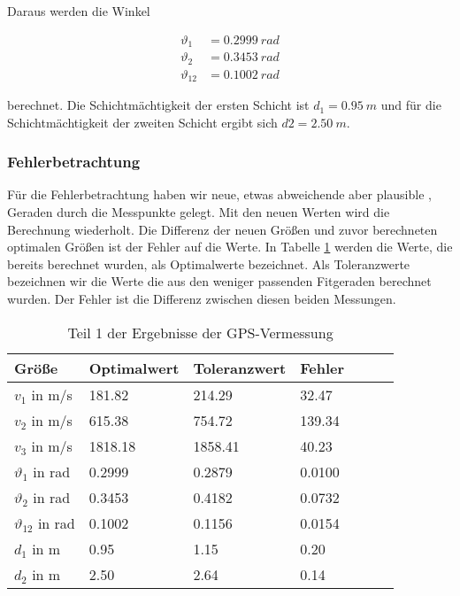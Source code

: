 Daraus werden die Winkel 

\begin{align}
 \vartheta_1 &= \SI{0.2999}{rad} \\
 \vartheta_2 &= \SI{0.3453}{rad} \\
 \vartheta_12 &= \SI{0.1002}{rad}
\end{align}

berechnet.
Die Schichtmächtigkeit der ersten Schicht ist $d_1 =\SI{0.95}{m}$ und für die Schichtmächtigkeit der zweiten Schicht ergibt sich $d2 = \SI{2.50}{m}$.\\

\subsubsection{Fehlerbetrachtung}

Für die Fehlerbetrachtung haben wir neue, etwas abweichende aber plausible , Geraden durch die Messpunkte gelegt. Mit den neuen Werten wird die Berechnung wiederholt. Die Differenz der neuen Größen und zuvor berechneten optimalen Größen ist der Fehler auf die Werte. In Tabelle \ref{tab:S21-S22} werden die Werte, die bereits berechnet wurden, als Optimalwerte bezeichnet. Als Toleranzwerte bezeichnen wir die Werte die aus den weniger passenden Fitgeraden berechnet wurden. Der Fehler ist die Differenz zwischen diesen beiden Messungen.


\begin{table}[!ht]
\centering
\caption{Teil 1 der Ergebnisse der GPS-Vermessung}
\label{tab:S21-S22}
\begin{tabular}{lllllll}
\toprule
Größe   & Optimalwert   & Toleranzwert   & Fehler \\
\midrule
$v_1$ in m/s & 181.82 & 214.29 & 32.47 \\
$v_2$ in m/s & 615.38 & 754.72 & 139.34 \\
$v_3$ in m/s & 1818.18 & 1858.41 & 40.23 \\
$\vartheta_1$ in rad & 0.2999 & 0.2879 & 0.0100 \\
$\vartheta_2$ in rad & 0.3453 & 0.4182 & 0.0732 \\
$\vartheta_{12}$ in rad & 0.1002 & 0.1156 & 0.0154 \\
$d_1$ in m & 0.95 & 1.15 & 0.20 \\
$d_2$ in m & 2.50 & 2.64 & 0.14 \\

\bottomrule
\end{tabular}
\end{table}


